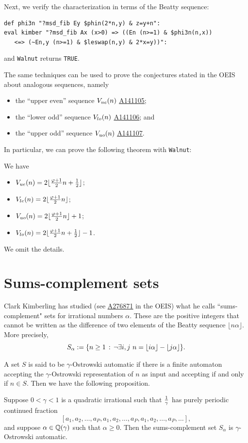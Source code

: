 \documentclass[12pt,reqno]{article}
\newcommand{\seqnum}[1]{\href{https://oeis.org/#1}{\rm \underline{#1}}}
\begin{document}
Next, we verify the characterization in terms of the
Beatty sequence:
\begin{verbatim}
def phi3n "?msd_fib Ey $phin(2*n,y) & z=y+n":
eval kimber "?msd_fib Ax (x>0) => ((En (n>=1) & $phi3n(n,x)) 
   <=> (~En,y (n>=1) & $leswap(n,y) & 2*x=y))":
\end{verbatim}
and {\tt Walnut} returns {\tt TRUE}.

The same techniques can be used to prove the  conjectures stated  in the OEIS
about analogous sequences, namely
\begin{itemize}
    \item the ``upper even'' sequence $V_{\rm ue}(n)$ \seqnum{A141105};
    \item the ``lower odd'' sequence $V_{\rm lo}(n)$
    \seqnum{A141106}; and
    \item the ``upper odd'' sequence $V_{\rm uo}(n)$
    \seqnum{A141107}.
\end{itemize}
In particular, we can prove the following theorem with
{\tt Walnut}:
\begin{theorem}
    We have
    \begin{itemize}
        \item[(a)] $V_{\rm ue} (n) = 2 \lfloor {{\varphi+1}\over 2} n + {1 \over 2} \rfloor$;
         \item[(b)] $V_{\rm le} (n) = 2 \lfloor {{\varphi+1}\over 2} n  \rfloor$;
         \item[(c)] $V_{\rm uo} (n) = 2 \lfloor {{\varphi+1}\over 2} n  \rfloor + 1$;
         \item[(d)] $V_{\rm lo} (n) = 2 \lfloor {{\varphi+1}\over 2} n + {1 \over 2}  \rfloor- 1$.
    \end{itemize}
\end{theorem}

We omit the details.

\section{Sums-complement sets}
\label{sec11}
Clark Kimberling has studied (see \seqnum{A276871} in the OEIS) what he calls ``sums-complement" sets for irrational numbers $\alpha$.  These are the positive integers
that cannot be written as the difference of
two elements of the Beatty sequence 
$\lfloor n\alpha  \rfloor$.   More precisely,
$$S_{\alpha} := \{ n \geq 1 \suchthat \neg\exists i,j \ 
n = \lfloor i \alpha  \rfloor - \lfloor j \alpha \rfloor \}.$$

A set $S$ is said to be $\gamma$-Ostrowski automatic if there is a finite automaton accepting the $\gamma$-Ostrowski representation of $n$ as input and accepting if and only if $n \in S$.   Then we have the following proposition.
\begin{theorem}
 Suppose $0 < \gamma < 1$ is a quadratic irrational
such that $1 \over\gamma$ has purely periodic continued
fraction
$$[a_1, a_2, \ldots, a_P, a_1, a_2, \ldots, a_P, a_1, a_2, \ldots, a_P,
\ldots],$$
and suppose $\alpha \in \mathbb{Q}(\gamma)$
such that $\alpha \geq 0$.   Then the sums-complement
set $S_{\alpha}$ is $\gamma$-Ostrowski automatic.
\end{theorem}
\end{document}
